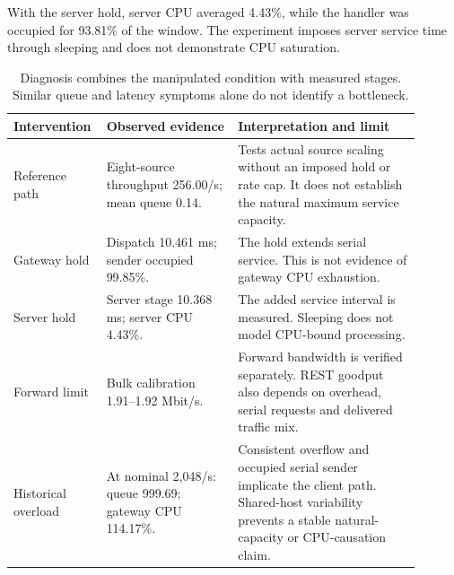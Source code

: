 With the server hold, server CPU averaged 4.43\%, while the handler was occupied for 93.81\% of the window. The experiment imposes server service time through sleeping and does not demonstrate CPU saturation.

\begin{table}[H]
\centering\small
\setlength{\tabcolsep}{4pt}
\begin{tabular}{p{0.16\linewidth}p{0.31\linewidth}p{0.43\linewidth}}
\hline
{\raggedright Intervention\par} & {\raggedright Observed evidence\par} & {\raggedright Interpretation and limit\par} \\
\hline
{\raggedright Reference path\par} & {\raggedright Eight-source throughput 256.00/s; mean queue 0.14.\par} & {\raggedright Tests actual source scaling without an imposed hold or rate cap. It does not establish the natural maximum service capacity.\par} \\
{\raggedright Gateway hold\par} & {\raggedright Dispatch 10.461 ms; sender occupied 99.85\%.\par} & {\raggedright The hold extends serial service. This is not evidence of gateway CPU exhaustion.\par} \\
{\raggedright Server hold\par} & {\raggedright Server stage 10.368 ms; server CPU 4.43\%.\par} & {\raggedright The added service interval is measured. Sleeping does not model CPU-bound processing.\par} \\
{\raggedright Forward limit\par} & {\raggedright Bulk calibration 1.91--1.92 Mbit/s.\par} & {\raggedright Forward bandwidth is verified separately. REST goodput also depends on overhead, serial requests and delivered traffic mix.\par} \\
{\raggedright Historical overload\par} & {\raggedright At nominal 2,048/s: queue 999.69; gateway CPU 114.17\%.\par} & {\raggedright Consistent overflow and occupied serial sender implicate the client path. Shared-host variability prevents a stable natural-capacity or CPU-causation claim.\par} \\
\hline
\end{tabular}
\caption{Diagnosis combines the manipulated condition with measured stages. Similar queue and latency symptoms alone do not identify a bottleneck.}
\label{tab:e1r-evidence}
\end{table}


